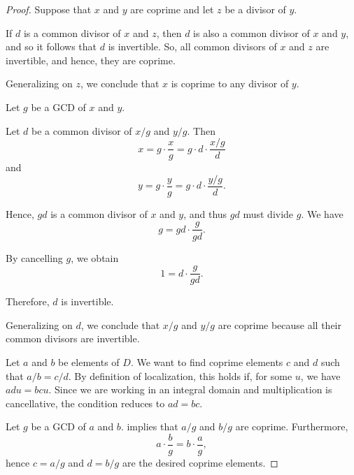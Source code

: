 \begin{proof}
   Suppose that \( x \) and \( y \) are coprime and let \( z \) be a divisor of \( y \).

  If \( d \) is a common divisor of \( x \) and \( z \), then \( d \) is also a common divisor of \( x \) and \( y \), and so it follows that \( d \) is invertible. So, all common divisors of \( x \) and \( z \) are invertible, and hence, they are coprime.

  Generalizing on \( z \), we conclude that \( x \) is coprime to any divisor of \( y \).

   Let \( g \) be a GCD of \( x \) and \( y \).

  Let \( d \) be a common divisor of \( x / g \) and \( y / g \). Then
  \begin{equation*}
    x = g \cdot \frac x g = g \cdot d \cdot \frac {x / g} d
  \end{equation*}
  and
  \begin{equation*}
    y = g \cdot \frac y g = g \cdot d \cdot \frac {y / g} d.
  \end{equation*}

  Hence, \( gd \) is a common divisor of \( x \) and \( y \), and thus \( gd \) must divide \( g \). We have
  \begin{equation*}
    g = gd \cdot \frac g {gd}.
  \end{equation*}

  By cancelling \( g \), we obtain
  \begin{equation*}
    1 = d \cdot \frac g {gd}.
  \end{equation*}

  Therefore, \( d \) is invertible.

  Generalizing on \( d \), we conclude that \( x / g \) and \( y / g \) are coprime because all their common divisors are invertible.

   Let \( a \) and \( b \) be elements of \( D \). We want to find coprime elements \( c \) and \( d \) such that \( a / b = c / d \). By definition of localization, this holds if, for some \( u \), we have \( adu = bcu \). Since we are working in an integral domain and multiplication is cancellative, the condition reduces to \( ad = bc \).

  Let \( g \) be a GCD of \( a \) and \( b \).  implies that \( a / g \) and \( b / g \) are coprime. Furthermore,
  \begin{equation*}
    a \cdot \frac b g = b \cdot \frac a g,
  \end{equation*}
  hence \( c = a / g \) and \( d = b / g \) are the desired coprime elements.
\end{proof}


